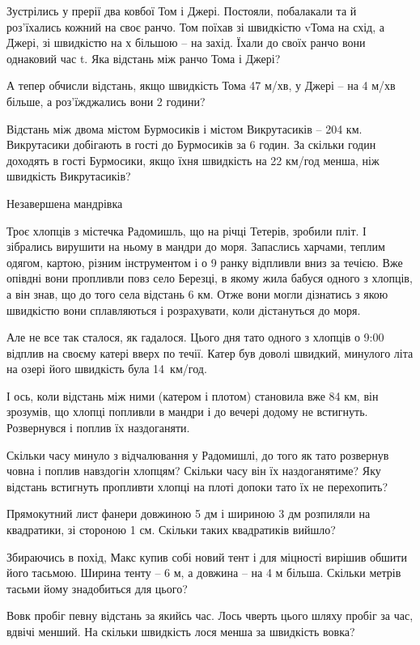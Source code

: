 \problem
Зустрілись у прерії два ковбої Том і Джері. Постояли, побалакали та й
роз’їхались кожний на своє ранчо. Том поїхав зі швидкістю vТома на схід,
а Джері, зі швидкістю на х більшою – на захід. Їхали до своїх ранчо
вони однаковий час t. Яка відстань між ранчо Тома і Джері?

А тепер обчисли відстань, якщо швидкість Тома 47 м/хв,
у Джері – на 4 м/хв більше, а роз’їжджались вони 2 години?


\problem
Відстань між двома містом Бурмосиків і містом Викрутасиків – 204 км.
Викрутасики добігають в гості до Бурмосиків за 6 годин.
За скільки годин доходять в гості Бурмосики,
якщо їхня швидкість на 22 км/год менша, ніж швидкість Викрутасиків?


\problem
Незавершена мандрівка

Троє хлопців з містечка Радомишль, що на річці Тетерів, зробили пліт.
І зібрались вирушити на ньому в мандри до моря. Запаслись харчами,
теплим одягом, картою, різним інструментом і о 9 ранку відпливли вниз
за течією. Вже опівдні вони пропливли повз село Березці, в якому жила
бабуся одного з хлопців, а він знав, що до того села відстань 6 км.
Отже вони могли дізнатись з якою швидкістю вони сплавляються
і розрахувати, коли дістануться до моря.

Але не все так сталося, як гадалося. Цього дня тато одного з хлопців
о 9:00 відплив на своєму катері вверх по течії. Катер був доволі швидкий,
минулого літа на озері його швидкість була 14 км/год.

І ось, коли відстань між ними (катером і плотом) становила вже 84 км,
він зрозумів, що хлопці попливли в мандри і до вечері додому не встигнуть.
Розвернувся і поплив їх наздоганяти.

Скільки часу минуло з відчалювання у Радомишлі, до того як тато
розвернув човна і поплив навздогін хлопцям?
Скільки часу він їх наздоганятиме?
Яку відстань встигнуть пропливти хлопці на плоті допоки тато їх не перехопить?


\problem
Прямокутний лист фанери довжиною 5 дм і шириною 3 дм розпиляли на квадратики,
зі стороною 1 см.
Скільки таких квадратиків вийшло?


\problem
Збираючись в похід, Макс купив собі новий тент і для міцності вирішив
обшити його тасьмою. Ширина тенту – 6 м, а довжина – на 4 м більша.
Скільки метрів тасьми йому знадобиться для цього?


\problem
Вовк пробіг певну відстань за якийсь час.
Лось чверть цього шляху пробіг за час, вдвічі менший.
На скільки швидкість лося менша за швидкість вовка?


